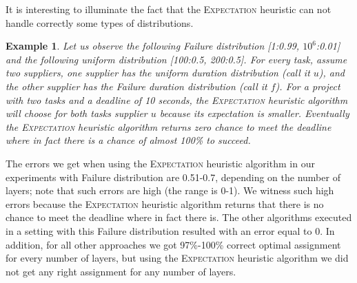 \documentclass[letterpaper]{article} %
\newtheorem{example}{Example}
\newcommand{\expectation}{\textsc{Expectation}\xspace}
\begin{document}
It is interesting to illuminate the fact that the \expectation heuristic can not handle correctly some types of distributions. 
\begin{example}
Let us observe the following Failure distribution [1:0.99, $10^6$:0.01] and the following uniform distribution [100:0.5, 200:0.5]. For every task, assume two suppliers, one supplier has the uniform duration distribution (call it $u$), and the other supplier has the Failure duration distribution (call it $f$). For a project with two tasks and a deadline of 10 seconds, the \expectation heuristic algorithm will choose for both tasks supplier $u$ because its expectation is smaller. Eventually the \expectation heuristic algorithm returns zero chance to meet the deadline where in fact there is a chance of almost 100\% to succeed. 
\end{example} 
The errors we get when using the \expectation heuristic algorithm in our experiments with Failure distribution are 0.51-0.7, depending on the number of layers; note that such errors are high (the range is 0-1). We witness such high errors because the \expectation heuristic algorithm returns that there is no chance to meet the deadline where in fact there is. The other algorithms executed in a setting with this Failure distribution resulted with an error equal to 0. In addition, for all other approaches we got 97\%-100\% correct optimal assignment for every number of layers, but using the \expectation heuristic algorithm we did not get any right assignment for any number of layers. 
\end{document}
